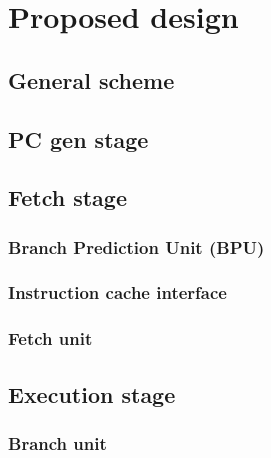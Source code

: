 \chapter{Proposed design}
\section{General scheme}

\section{PC gen stage}

\section{Fetch stage}

\subsection{Branch Prediction Unit (BPU)}

\subsection{Instruction cache interface}

\subsection{Fetch unit}

\section{Execution stage}

\subsection{Branch unit}